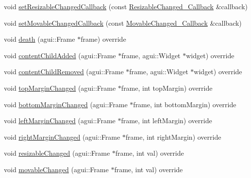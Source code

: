 \begin{DoxyCompactItemize}
\item 
void \mbox{\hyperlink{classec_1_1_generic_frame_listener_a062cd0fc0c81cd1d873ce89fdee61131}{set\+Resizable\+Changed\+Callback}} (const \mbox{\hyperlink{classec_1_1_generic_frame_listener_a726ee9bf39ca67b4fe60a1a0cc038058}{Resizable\+Changed\+\_\+\+Callback}} \&callback)
\item 
void \mbox{\hyperlink{classec_1_1_generic_frame_listener_a98796b79c329edbf251f1186af2381ed}{set\+Movable\+Changed\+Callback}} (const \mbox{\hyperlink{classec_1_1_generic_frame_listener_a4ed5abe7907c3c2e367e8a6f1a2b01ac}{Movable\+Changed\+\_\+\+Callback}} \&callback)
\item 
void \mbox{\hyperlink{classec_1_1_generic_frame_listener_a43af8025790adcfc67ba3e60815f7114}{death}} (agui\+::\+Frame $\ast$frame) override
\item 
void \mbox{\hyperlink{classec_1_1_generic_frame_listener_a20561e09362299e4e35655a82ddf8ffd}{content\+Child\+Added}} (agui\+::\+Frame $\ast$frame, agui\+::\+Widget $\ast$widget) override
\item 
void \mbox{\hyperlink{classec_1_1_generic_frame_listener_ae84c7dca30d3491994fbd806bc92ddd1}{content\+Child\+Removed}} (agui\+::\+Frame $\ast$frame, agui\+::\+Widget $\ast$widget) override
\item 
void \mbox{\hyperlink{classec_1_1_generic_frame_listener_a4933c59bc4775bc77308e38e018068d8}{top\+Margin\+Changed}} (agui\+::\+Frame $\ast$frame, int top\+Margin) override
\item 
void \mbox{\hyperlink{classec_1_1_generic_frame_listener_af9608075672891583d2710972ad197c8}{bottom\+Margin\+Changed}} (agui\+::\+Frame $\ast$frame, int bottom\+Margin) override
\item 
void \mbox{\hyperlink{classec_1_1_generic_frame_listener_a5d21a7e2ed3c31523cd0b8496301d61a}{left\+Margin\+Changed}} (agui\+::\+Frame $\ast$frame, int left\+Margin) override
\item 
void \mbox{\hyperlink{classec_1_1_generic_frame_listener_a82c46fdb41b9dcb3170bc18ce0c2e55e}{right\+Margin\+Changed}} (agui\+::\+Frame $\ast$frame, int right\+Margin) override
\item 
void \mbox{\hyperlink{classec_1_1_generic_frame_listener_a73f3d2c1cac3a15bc5c72f46565f7135}{resizable\+Changed}} (agui\+::\+Frame $\ast$frame, int val) override
\item 
void \mbox{\hyperlink{classec_1_1_generic_frame_listener_ad109c8ff0553d689e6981f6dec737f3a}{movable\+Changed}} (agui\+::\+Frame $\ast$frame, int val) override
\end{DoxyCompactItemize}


